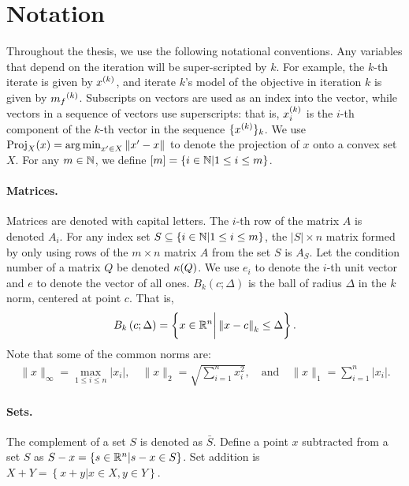 \vspace{1cm}
\section{Notation}
Throughout the thesis, we use the following notational conventions.
Any variables that depend on the iteration will be super-scripted by $k$.
For example, the $k$-th iterate is given by $x^{(k)}$, and iterate $k$'s model of the objective in iteration $k$ is given by ${{m}_f}^{(k)}$.
Subscripts on vectors are used as an index into the vector, while vectors in a sequence of vectors use superscripts:
that is, $x_i^{(k)}$ is the $i$-th component of the $k$-th vector in the sequence $\{x^{(k)}\}_k$.
We use ${\textrm{Proj}}_X(x) = \operatorname*{arg\,min}_{x' \in X}\left\|x' - x\right\|$ to denote the projection of $x$ onto a convex set $X$.
For any $m \in \mathbb N$, we define $[m] = \left\{i \in \mathbb N | 1 \le i \le m\right\}$.

\paragraph*{Matrices.}
Matrices are denoted with capital letters.
The $i$-th row of the matrix $A$ is denoted $A_i$.
For any index set $S \subseteq \{i \in \mathbb N | 1 \le i \le m\}$, the $|S| \times n$ matrix formed by only using
rows of the $m\times n$ matrix $A$ from the set $S$ is $A_S$.
Let the condition number of a matrix $Q$ be denoted ${\kappa}(Q)$.
We use $e_i$ to denote the $i$-th unit vector and $e$ to denote the vector of all ones.
$B_k\left(c; \Delta\right)$ is the ball of radius $\Delta$ in the $k$ norm, centered at point $c$.  That is,
\begin{align}
\label{define_ball}
B_k\left(c; \Delta\right) = \left\{x \in \mathbb R^n \bigg | \left\|x - c\right\|_k \le \Delta \right\}.
\end{align}
Note that some of the common norms are:
\begin{align*}
\|x\|_{\infty} = \max_{1\le i\le n}|x_i|, \quad
\|x\|_{2} = \sqrt{\sum_{i=1}^n x_i^2}, \quad \textrm{and} \quad
\|x\|_1 = \sum_{i = 1}^n |x_i|.
\end{align*}

\paragraph*{Sets.}
The complement of a set $S$ is denoted as $\bar S$.
Define a point $x$ subtracted from a set $S$ as $S - x = \left\{s \in \mathbb R^n | s - x \in S\right\}$.
Set addition is $X + Y = \left\{x + y | x \in X, y \in Y\right\}$.

